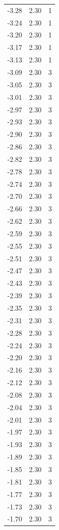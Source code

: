 \begin{longtable}{lrr}
  -3.28 & 2.30 & 1 \\
  -3.24 & 2.30 & 1 \\
  -3.20 & 2.30 & 1 \\
  -3.17 & 2.30 & 1 \\
  -3.13 & 2.30 & 1 \\
  -3.09 & 2.30 & 3 \\
  -3.05 & 2.30 & 3 \\
  -3.01 & 2.30 & 3 \\
  -2.97 & 2.30 & 3 \\
  -2.93 & 2.30 & 3 \\
  -2.90 & 2.30 & 3 \\
  -2.86 & 2.30 & 3 \\
  -2.82 & 2.30 & 3 \\
  -2.78 & 2.30 & 3 \\
  -2.74 & 2.30 & 3 \\
  -2.70 & 2.30 & 3 \\
  -2.66 & 2.30 & 3 \\
  -2.62 & 2.30 & 3 \\
  -2.59 & 2.30 & 3 \\
  -2.55 & 2.30 & 3 \\
  -2.51 & 2.30 & 3 \\
  -2.47 & 2.30 & 3 \\
  -2.43 & 2.30 & 3 \\
  -2.39 & 2.30 & 3 \\
  -2.35 & 2.30 & 3 \\
  -2.31 & 2.30 & 3 \\
  -2.28 & 2.30 & 3 \\
  -2.24 & 2.30 & 3 \\
  -2.20 & 2.30 & 3 \\
  -2.16 & 2.30 & 3 \\
  -2.12 & 2.30 & 3 \\
  -2.08 & 2.30 & 3 \\
  -2.04 & 2.30 & 3 \\
  -2.01 & 2.30 & 3 \\
  -1.97 & 2.30 & 3 \\
  -1.93 & 2.30 & 3 \\
  -1.89 & 2.30 & 3 \\
  -1.85 & 2.30 & 3 \\
  -1.81 & 2.30 & 3 \\
  -1.77 & 2.30 & 3 \\
  -1.73 & 2.30 & 3 \\
  -1.70 & 2.30 & 3 \\

\end{longtable}
